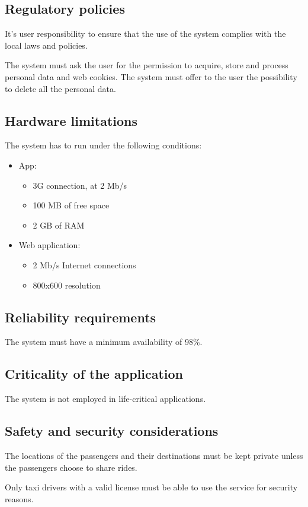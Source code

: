 \subsection{Regulatory policies}
It's user responsibility to ensure that the use of the system complies with the local laws and policies.

The system must ask the user for the permission to acquire, store and process personal data and web cookies. The system must offer to the user the possibility to delete all the personal data.

\subsection{Hardware limitations}
The system has to run under the following conditions:
\begin{itemize}
\item App:
\begin{itemize}
\item 3G connection, at 2 Mb/s
\item 100 MB of free space
\item 2 GB of RAM
\end{itemize}
\item Web application:
\begin{itemize}
\item 2 Mb/s Internet connections
\item 800x600 resolution
\end{itemize}
\end{itemize}

\subsection{Reliability requirements}
The system must have a minimum availability of 98\%.

\subsection{Criticality of the application}
The system is not employed in life-critical applications.

\subsection{Safety and security considerations}
The locations of the passengers and their destinations must be kept private unless the passengers choose to share rides.

Only taxi drivers with a valid license must be able to use the service for security reasons.
